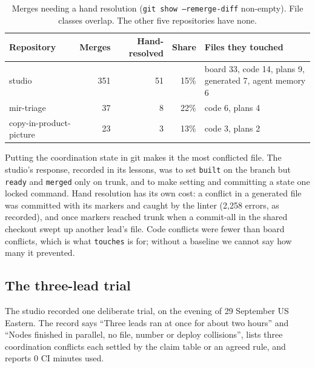 \documentclass[11pt]{article}
\newcommand{\code}[1]{\texttt{#1}}
\begin{document}
\begin{table}[t]
\centering
\small
\caption{Merges needing a hand resolution (\code{git show --remerge-diff} non-empty). File
classes overlap. The other five repositories have none.}
\label{tab:merges}
\begin{tabularx}{\linewidth}{@{}lrrrY@{}}
\toprule
Repository & Merges & Hand-resolved & Share & Files they touched \\
\midrule
studio & 351 & 51 & 15\% & board 33, code 14, plans 9, generated 7, agent memory 6 \\ %
mir-triage & 37 & 8 & 22\% & code 6, plans 4 \\ %
copy-in-product-picture & 23 & 3 & 13\% & code 3, plans 2 \\ %
\bottomrule
\end{tabularx}
\end{table}

Putting the coordination state in git makes it the most conflicted file. The studio's
response, recorded in its lessons, was to set \code{built} on the branch but \code{ready} %
and \code{merged} only on trunk, and to make setting and committing a state one locked
command. Hand resolution has its own cost: a conflict in a generated file was committed
with its markers and caught by the linter (2,258 errors, as recorded), and once markers %
reached trunk when a commit-all in the shared checkout swept up another lead's file. %
Code conflicts were fewer than board conflicts, which is what \code{touches} is for;
without a baseline we cannot say how many it prevented.

\subsection{The three-lead trial}\label{sec:trial}

The studio recorded one deliberate trial, on the evening of 29 September US Eastern. The %
record says ``Three leads ran at once for about two hours'' and ``Nodes finished in
parallel, no file, number or deploy collisions'', lists three coordination conflicts each
settled by the claim table or an agreed rule, and reports 0 CI minutes used.
\end{document}
